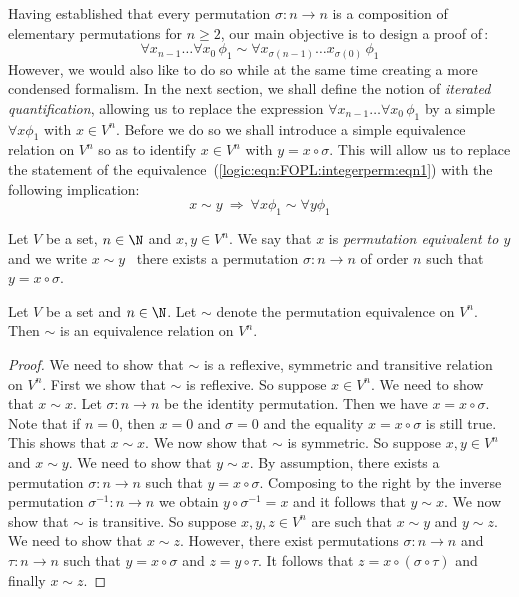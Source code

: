 Having established that every permutation $\sigma:n\to n$ is a
composition of elementary permutations for $n\geq 2$, our main
objective is to design a proof of\,:
    \begin{equation}\label{logic:eqn:FOPL:integerperm:eqn1}
    \forall x_{n-1}\ldots\forall x_{0}\,\phi_{1}\sim\forall
    x_{\sigma(n-1)}\ldots x_{\sigma(0)}\,\phi_{1}
    \end{equation}
However, we would also like to do so while at the same time creating
a more condensed formalism. In the next section, we shall define the
notion of {\em iterated quantification}, allowing us to replace the
expression $ \forall x_{n-1}\ldots\forall x_{0}\,\phi_{1}$ by a
simple $\forall x\phi_{1}$ with $x\in V^{n}$. Before we do so we
shall introduce a simple equivalence relation on $V^{n}$ so as to
identify $x\in V^{n}$ with $y=x\circ\sigma$. This will allow us to
replace the statement of the
equivalence~(\ref{logic:eqn:FOPL:integerperm:eqn1}) with the
following implication:
    \[
    x\sim y\ \Rightarrow\ \forall x\phi_{1}\sim\forall
    y\phi_{1}
    \]
\begin{defin}\label{logic:def:permutation:equivalence:vn}
Let $V$ be a set, $n\in\N$ and $x,y\in V^{n}$. We say that $x$ is
{\em permutation equivalent to $y$} and we write $x\sim y$ \ifand\
there exists a permutation $\sigma:n\to n$ of order $n$ such that
$y=x\circ \sigma$.
\end{defin}
\begin{prop}\label{logic:prop:permutation:equivalence:vn}
Let $V$ be a set and $n\in\N$. Let $\sim$ denote the permutation
equivalence on $V^{n}$. Then $\sim$ is an equivalence relation on
$V^{n}$.
\end{prop}
\begin{proof}
We need to show that $\sim$ is a reflexive, symmetric and transitive
relation on $V^{n}$. First we show that $\sim$ is reflexive. So
suppose $x\in V^{n}$. We need to show that $x\sim x$. Let
$\sigma:n\to n$ be the identity permutation. Then we have $x=x\circ
\sigma$. Note that if $n=0$, then $x=0$ and $\sigma=0$ and the
equality $x=x\circ\sigma$ is still true. This shows that $x\sim x$.
We now show that $\sim$ is symmetric. So suppose $x,y\in V^{n}$ and
$x\sim y$. We need to show that $y\sim x$. By assumption, there
exists a permutation $\sigma:n\to n$ such that $y=x\circ \sigma$.
Composing to the right by the inverse permutation $\sigma^{-1}:n\to
n$ we obtain $y\circ \sigma^{-1} = x$ and it follows that $y\sim x$.
We now show that $\sim$ is transitive. So suppose $x,y,z\in V^{n}$
are such that $x\sim y$ and $y\sim z$. We need to show that $x\sim
z$. However, there exist permutations $\sigma:n\to n$ and $\tau:n\to
n$ such that $y=x\circ \sigma$ and $z=y\circ \tau$. It follows that
$z=x\circ(\sigma\circ\tau)$ and finally $x\sim z$.
\end{proof}
